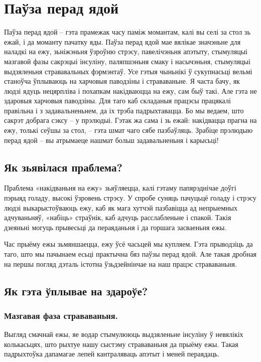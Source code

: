 \chapter{Паўза перад ядой}

Паўза перад ядой – гэта прамежак часу паміж момантам, калі вы селі за стол зь ежай, і да моманту пачатку яды. Паўза перад ядой мае вялікае значэньне для наладкі на ежу, зьніжэньня ўзроўню стрэсу, павелічэньня апэтыту, стымуляцыі мазгавой фазы сакрэцыі інсуліну, паляпшэньня смаку і насычэньня, стымуляцыі выдзяленьня стрававальных фэрмэнтаў. Усе гэтыя чыньнікі ў сукупнасьці вельмі станоўча ўплываюць на харчовыя паводзіны і страваваньне. Я часта бачу, як людзі ядуць нецярпліва і похапкам накідваюцца на ежу, сам быў такі. Але гэта не здаровыя харчовыя паводзіны. Для таго каб складаныя працэсы працякалі правільна і з задавальненьнем, да іх трэба падрыхтавацца. Бо мы ведаем, што сакрэт добрага сэксу – у прэлюдыі. Гэтак жа сама і зь ежай: накідвацца прагна на ежу, толькі сеўшы за стол, – гэта шмат чаго сябе пазбаўляць. Зрабіце прэлюдыю перад ядой – вы атрымаеце нашмат больш задавальненьня і карысьці!

\section{Як зьявілася праблема?}

Праблема «накідваньня на ежу» зьяўляецца, калі гэтаму папярэднічае доўгі пэрыяд голаду, высокі ўзровень стрэсу. У спробе суняць пачуцьцё голаду і стрэсу людзі выкарыстоўваюць ежу, каб як мага хутчэй пазбавіцца ад непрыемных адчуваньняў, «набіць» страўнік, каб адчуць расслабленьне і спакой. Такія дзеяньні могуць прывесьці да пераяданьня і да горшага засваеньня ежы.

Час прыёму ежы зьмяншаецца, ежу ўсё часьцей мы купляем. Гэта прыводзіць да таго, што мы пачынаем есьці практычна бяз паўзы перад ядой. Але такая дробная на першы погляд дэталь істотна ўзьдзейнінчае на наш працэс страваваньня.

\section{Як гэта ўплывае на здароўе?}

\subsection{Мазгавая фаза страваваньня.}
Выгляд смачнай ежы, яе водар стымулююць выдзяленьне інсуліну ў невялікіх колькасьцях, што рыхтуе нашу сыстэму страваваньня да прыёму ежы. Такая падрыхтоўка дапамагае лепей кантраляваць апэтыт і меней пераядаць.

